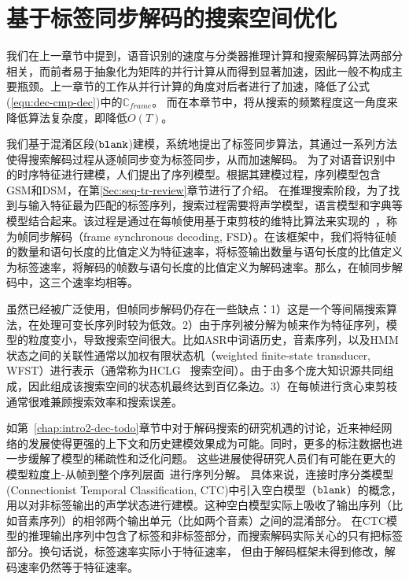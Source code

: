 
\chapter{基于标签同步解码的搜索空间优化}
\label{chap:lsd}

我们在上一章节中提到，语音识别的速度与分类器推理计算和搜索解码算法两部分相关，而前者易于抽象化为矩阵的并行计算从而得到显著加速，因此一般不构成主要瓶颈。上一章节的工作从并行计算的角度对后者进行了加速，降低了公式(\ref{equ:dec-cmp-dec})中的$\mathbb{C}_{frame}$。
而在本章节中，将从搜索的频繁程度这一角度来降低算法复杂度，即降低$O(T)$。

我们基于混淆区段($\tt blank$)建模，系统地提出了标签同步算法，其通过一系列方法使得搜索解码过程从逐帧同步变为标签同步，从而加速解码。
%
为了对语音识别中的时序特征进行建模，人们提出了序列模型。根据其建模过程，序列模型包含GSM和DSM，在第\ref{Sec:seq-tr-review}章节进行了介绍。
在推理搜索阶段，为了找到与输入特征最为匹配的标签序列，搜索过程需要将声学模型，语言模型和字典等模型结合起来。该过程是通过在每帧使用基于束剪枝的维特比算法来实现的~\cite{forney1973viterbi}，称为帧同步解码（frame synchronous decoding, FSD）。在该框架中，我们将特征帧的数量和语句长度的比值定义为特征速率，将标签输出数量与语句长度的比值定义为标签速率，将解码的帧数与语句长度的比值定义为解码速率。那么，在帧同步解码中，这三个速率均相等。

虽然已经被广泛使用，但帧同步解码仍存在一些缺点：1）这是一个等间隔搜索算法，在处理可变长序列时较为低效。2）由于序列被分解为帧来作为特征序列，模型的粒度变小，导致搜索空间很大。比如ASR中词语历史，音素序列，以及HMM状态之间的关联性通常以加权有限状态机（weighted finite-state transducer, WFST）进行表示（通常称为HCLG~\cite{mohri2002weighted} 搜索空间）。由于由多个庞大知识源共同组成，因此组成该搜索空间的状态机最终达到百亿条边。3）在每帧进行贪心束剪枝通常很难兼顾搜索效率和搜索误差。

如第~\ref{chap:intro2-dec-todo}章节中对于解码搜索的研究机遇的讨论，近来神经网络的发展使得更强的上下文和历史建模效果成为可能\cite{sak2014long,qian2016very}。同时，更多的标注数据也进一步缓解了模型的稀疏性和泛化问题。
这些进展使得研究人员们有可能在更大的模型粒度上-从帧到整个序列层面~\cite{amodei2015deep,soltau2016neural,collobert2016wav2letter,sak2015fast,chan2016end}进行序列分解。
具体来说，连接时序分类模型 (Connectionist Temporal Classification, CTC)中引入空白模型（$\tt blank$）的概念，用以对非标签输出的声学状态进行建模。这种空白模型实际上吸收了输出序列（比如音素序列）的相邻两个输出单元（比如两个音素）之间的混淆部分。
在CTC模型的推理输出序列中包含了标签和非标签部分，而搜索解码实际关心的只有把标签部分。换句话说，标签速率实际小于特征速率，
但由于解码框架未得到修改，解码速率仍然等于特征速率。


